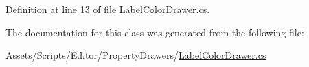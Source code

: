 Definition at line 13 of file Label\+Color\+Drawer.\+cs.



The documentation for this class was generated from the following file\+:\begin{DoxyCompactItemize}
\item 
Assets/\+Scripts/\+Editor/\+Property\+Drawers/\mbox{\hyperlink{_label_color_drawer_8cs}{Label\+Color\+Drawer.\+cs}}\end{DoxyCompactItemize}
